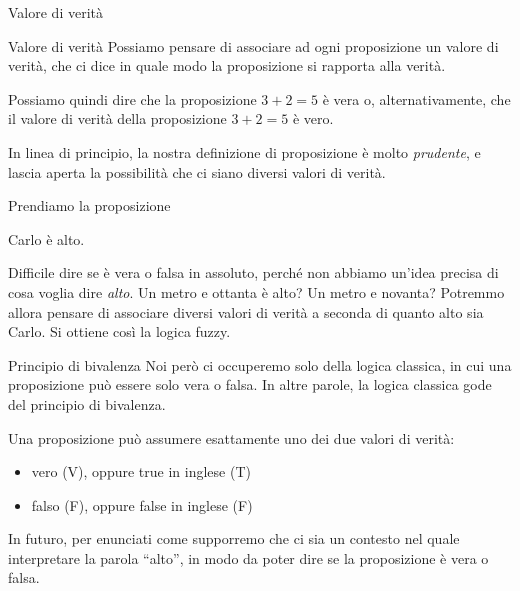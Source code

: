 \documentclass[aspectratio=169,10pt,dvipsnames,handout]{beamer}
\begin{document}
\begin{frame}{Valore di verità}
    \begin{block}{Valore di verità}
        Possiamo pensare di associare ad ogni proposizione un \alert{valore di verità}, che ci dice in quale modo la proposizione si rapporta alla verità.
    \end{block}
    Possiamo quindi dire che la proposizione $3+2=5$ è vera o, alternativamente, che il valore di verità della proposizione $3+2=5$ è vero.

    \medskip\pause
    In linea di principio, la nostra definizione di proposizione è molto \emph{prudente}, e lascia aperta la possibilità che ci siano diversi valori di verità.

    \begin{example}
        Prendiamo la proposizione
        \begin{proposition}
            Carlo è alto.
        \end{proposition}
        Difficile dire se è vera o falsa in assoluto, perché non abbiamo un'idea precisa di cosa voglia dire \emph{alto}. Un metro e ottanta è alto? Un metro e novanta? Potremmo allora pensare di associare diversi valori di verità a seconda di quanto alto sia Carlo. Si ottiene così la \alert{logica fuzzy}.
    \end{example}
\end{frame}

\begin{frame}{Principio di bivalenza}
    Noi però ci occuperemo solo della \alert{logica classica}, in cui una proposizione può essere solo vera o falsa. In altre parole, la logica classica gode del \alert{principio di bivalenza}.

    \begin{definition}
        Una proposizione può assumere esattamente uno dei due valori di verità:
        \begin{itemize}
            \item vero (\alert{V}), oppure true in inglese (\alert{T})
            \item falso (\alert{F}), oppure false in inglese (\alert{F})
        \end{itemize}
    \end{definition}

    \pause\medskip
    In futuro, per enunciati come  supporremo che ci sia un contesto nel quale interpretare la parola ``alto'', in modo da poter dire se la proposizione è vera o falsa.
\end{frame}
\end{document}
